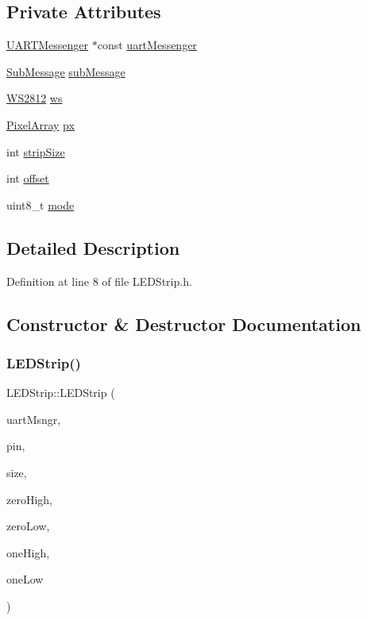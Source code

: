 \subsection*{Private Attributes}
\begin{DoxyCompactItemize}
\item 
\hyperlink{class_u_a_r_t_messenger}{U\+A\+R\+T\+Messenger} $\ast$const \hyperlink{class_l_e_d_strip_a4387042fe2a80bcd5dc3e9d7524800ae}{uart\+Messenger}
\item 
\hyperlink{struct_sub_message}{Sub\+Message} \hyperlink{class_l_e_d_strip_a25cf156735c1629b92b8dfe7a54e9b41}{sub\+Message}
\item 
\hyperlink{class_w_s2812}{W\+S2812} \hyperlink{class_l_e_d_strip_a81c4bffd481d09defe63642c9e69ed17}{ws}
\item 
\hyperlink{class_pixel_array}{Pixel\+Array} \hyperlink{class_l_e_d_strip_aa8a8764862dbb64aedc0b53cfe3fc22b}{px}
\item 
int \hyperlink{class_l_e_d_strip_af1987ffe7252fa35b42ad3698c3de454}{strip\+Size}
\item 
int \hyperlink{class_l_e_d_strip_a37a3616a79fe3dda93c145d14543199c}{offset}
\item 
uint8\+\_\+t \hyperlink{class_l_e_d_strip_ac209f99d6a633cd4c672fc16a991f4f8}{mode}
\end{DoxyCompactItemize}


\subsection{Detailed Description}


Definition at line 8 of file L\+E\+D\+Strip.\+h.



\subsection{Constructor \& Destructor Documentation}
\mbox{\label{class_l_e_d_strip_a746e420e05c5d6c45eb2f74eaf5928fc}} 
\subsubsection{\texorpdfstring{L\+E\+D\+Strip()}{LEDStrip()}}
{\footnotesize\ttfamily L\+E\+D\+Strip\+::\+L\+E\+D\+Strip (\begin{DoxyParamCaption}\item[{\hyperlink{class_u_a_r_t_messenger}{U\+A\+R\+T\+Messenger} $\ast$const}]{uart\+Msngr,  }\item[{Pin\+Name}]{pin,  }\item[{int}]{size,  }\item[{int}]{zero\+High,  }\item[{int}]{zero\+Low,  }\item[{int}]{one\+High,  }\item[{int}]{one\+Low }\end{DoxyParamCaption})}



